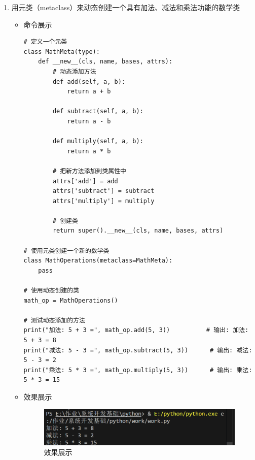 \documentclass[UTF8]{ctexart}
\begin{document}
\begin{enumerate}
  \item 用元类（metaclass）来动态创建一个具有加法、减法和乘法功能的数学类
  \begin{itemize}
    \item 命令展示
    \begin{verbatim}
# 定义一个元类
class MathMeta(type):
    def __new__(cls, name, bases, attrs):
        # 动态添加方法
        def add(self, a, b):
            return a + b

        def subtract(self, a, b):
            return a - b

        def multiply(self, a, b):
            return a * b

        # 把新方法添加到类属性中
        attrs['add'] = add
        attrs['subtract'] = subtract
        attrs['multiply'] = multiply

        # 创建类
        return super().__new__(cls, name, bases, attrs)

# 使用元类创建一个新的数学类
class MathOperations(metaclass=MathMeta):
    pass

# 使用动态创建的类
math_op = MathOperations()

# 测试动态添加的方法
print("加法: 5 + 3 =", math_op.add(5, 3))          # 输出: 加法: 5 + 3 = 8
print("减法: 5 - 3 =", math_op.subtract(5, 3))      # 输出: 减法: 5 - 3 = 2
print("乘法: 5 * 3 =", math_op.multiply(5, 3))      # 输出: 乘法: 5 * 3 = 15
    \end{verbatim}

    \item 效果展示
    \begin{figure}[H]
      \centering
      \includegraphics[width=\textwidth]{22} %
      \caption{效果展示}
    \end{figure}
  \end{itemize}
\end{enumerate}
\end{document}
